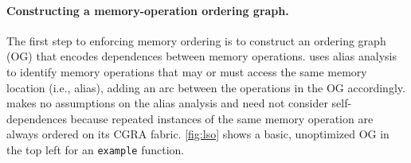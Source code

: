 \paragraph{Constructing a memory-operation ordering graph.} 
The first step to enforcing memory ordering is to construct an ordering graph (OG) that encodes dependences between memory operations.
% 
\riptidecomp uses alias analysis to identify memory operations
that may or must access the same memory location (i.e., alias), adding an arc between the operations in the OG accordingly.
%
\riptidecomp makes no assumptions on the alias analysis and
%
%
need not consider self-dependences because repeated instances of the
same memory operation are always ordered on its CGRA fabric. %
%
\autoref{fig:lso} shows a basic, unoptimized OG in the top left for an 
{\tt example} function.

